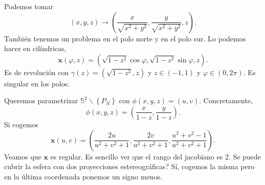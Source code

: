 \begin{eg}
Podemos tomar
\[ \left(x,y,z\right)\to \left(\frac{x}{\sqrt{x^{2}+y^{2}}}, \frac{y}{\sqrt{x^{2}+y^{2}}}, z\right) .\]
También tenemos un problema en el polo norte y en el polo sur. Lo podemos hacer en cilíndricas,
\[ \textbf{x} \left(\varphi, z\right)=\left(\sqrt{1-z^{2}}\cos\varphi, \sqrt{1-z^{2}}\sin\varphi, z\right).\]
Es de revolución con $\displaystyle \gamma\left(z\right)=\left(\sqrt{1-z^{2}}, z\right) $ y $\displaystyle z \in \left(-1,1\right) $ y $\displaystyle \varphi\in \left(0,2\pi \right) $. Es singular en los polos. 
\end{eg}
\begin{eg}
	Queremos parametrizar $\displaystyle \mathbb{S}^{2} \backslash \left\{ P_{N}\right\}  $ con $\displaystyle \phi\left(x,y,z\right)=\left(u,v\right) $. Concretamente, 
	\[\phi\left(x,y,z\right)=\left(\frac{x}{1-z}, \frac{y}{1-z}\right) .\]
Si cogemos 
\[ \textbf{x} \left(u,v\right)=\left(\frac{2u}{u^{2} + v^{2}+1}, \frac{2v}{u^{2}+v^{2}+1}, \frac{u^{2}+v^{2}-1}{u^{2}+v^{2}+1}\right) .\]
Veamos que $\displaystyle \textbf{x}  $ es regular. Es sencillo ver que el rango del jacobiano es 2. Se puede cubrir la esfera con dos proyecciones estereográficas? Sí, cogemos la misma pero en la última coordenada ponemos un signo menos. 
\end{eg}
